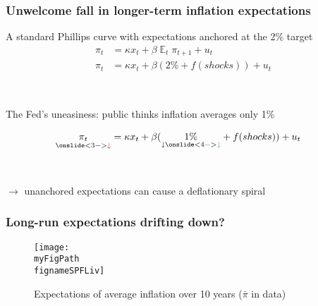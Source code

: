 \documentclass[10pt]{beamer}
\def \myFigPath {../../../figures/}
\DeclareMathOperator{\E}{\mathbb{E}}
\def\fignameSPFLiv{epi_in_data_command_anchoring_in_data_14_Sep_2020_18_12_59}
\begin{document}
\begin{frame}
\frametitle{Unwelcome fall in longer-term inflation expectations}

A standard Phillips curve with expectations anchored at the 2\% target	
\begin{align}
\pi_t & = \kappa x_t + \beta \E_t \pi_{t+1} + u_t \label{standardPC} \\
\pi_t & = \kappa x_t + \beta (2\% + f(shocks)) + u_t \label{standardPC} 
\end{align}


\

\pause

The Fed's uneasiness: public thinks inflation averages only 1\%

\begin{align}
\underset{ \onslide<3->{\textcolor{brownreddark}{\downarrow}}} {\pi_t} & = \kappa x_t + \beta (\underset{\downarrow \onslide<4->{\textcolor{aquamarinegreen}{\downarrow}}}{1\%}  + f(shocks)) + u_t 
\end{align}

\

\pause
\pause
\pause

$\rightarrow$ unanchored expectations can cause a deflationary spiral


\end{frame}

\begin{frame}\label{LRE_drifting_down}
\frametitle{Long-run expectations drifting down?}
	

\begin{figure}[h!]
\caption{Expectations of average inflation over 10 years ($\bar{\pi}$ in data)}
\texttt{[image: \\myFigPath \\fignameSPFLiv]}
\label{epi}
\end{figure}



\vspace{-0.5cm}
\hfill \hyperlink{app_TIPS}{}
\end{frame}
\end{document}
